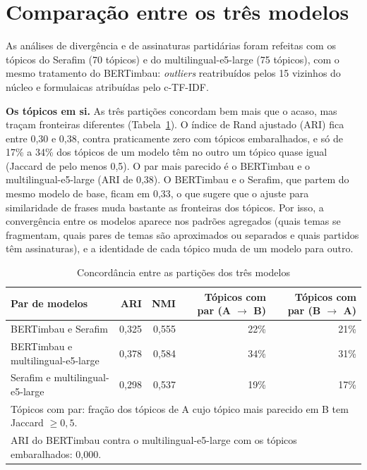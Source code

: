 \documentclass[12pt]{article}
\newcommand{\tabfont}{\fontsize{9}{11}\selectfont\setlength{\tabcolsep}{2.5pt}}
\begin{document}
\clearpage
\section{Comparação entre os três modelos}
\label{app:modelos}

As análises de divergência e de assinaturas partidárias foram refeitas com os tópicos do Serafim (70 tópicos) e do multilingual-e5-large (75 tópicos), com o mesmo tratamento do BERTimbau: \textit{outliers} reatribuídos pelos 15 vizinhos do núcleo e formulaicas atribuídas pelo c-TF-IDF.

\textbf{Os tópicos em si.} As três partições concordam bem mais que o acaso, mas traçam fronteiras diferentes (Tabela~\ref{tab:particoes}). O índice de Rand ajustado (ARI) fica entre 0,30 e 0,38, contra praticamente zero com tópicos embaralhados, e só de 17\% a 34\% dos tópicos de um modelo têm no outro um tópico quase igual (Jaccard de pelo menos 0,5). O par mais parecido é o BERTimbau e o multilingual-e5-large (ARI de 0,38). O BERTimbau e o Serafim, que partem do mesmo modelo de base, ficam em 0,33, o que sugere que o ajuste para similaridade de frases muda bastante as fronteiras dos tópicos. Por isso, a convergência entre os modelos aparece nos padrões agregados (quais temas se fragmentam, quais pares de temas são aproximados ou separados e quais partidos têm assinaturas), e a identidade de cada tópico muda de um modelo para outro.

\begin{table}[H]
\centering
\caption{Concordância entre as partições dos três modelos}
\label{tab:particoes}
\tabfont
\begin{tabular}{l r r r r}
\toprule
\textbf{Par de modelos} & \textbf{ARI} & \textbf{NMI} & \textbf{Tópicos com par (A $\to$ B)} & \textbf{Tópicos com par (B $\to$ A)} \\
\midrule
BERTimbau e Serafim & 0,325 & 0,555 & 22\% & 21\% \\
BERTimbau e multilingual-e5-large & 0,378 & 0,584 & 34\% & 31\% \\
Serafim e multilingual-e5-large & 0,298 & 0,537 & 19\% & 17\% \\
\midrule
\multicolumn{5}{l}{Tópicos com par: fração dos tópicos de A cujo tópico mais parecido em B tem Jaccard $\geq 0{,}5$.} \\
\multicolumn{5}{l}{ARI do BERTimbau contra o multilingual-e5-large com os tópicos embaralhados: 0,000.} \\
\bottomrule
\end{tabular}
\end{table}
\end{document}
